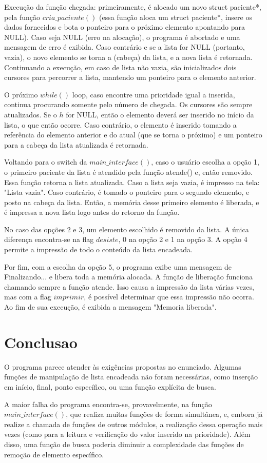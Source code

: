 \documentclass{article}
\begin{document}
Execução da função chegada: primeiramente, é alocado um novo struct paciente*, pela função $cria\_paciente()$ (essa função aloca um struct paciente*, insere os dados fornecidos e bota o ponteiro para o próximo elemento apontando para NULL). Caso seja NULL (erro na alocação), o programa é abortado e uma mensagem de erro é exibida. Caso contrário e se a lista for NULL (portanto, vazia), o novo elemento se torna a (cabeça) da lista, e a nova lista é retornada. Continuando a execução, em caso de lista não vazia, são inicializados dois cursores para percorrer a lista, mantendo um ponteiro para o elemento anterior.

O próximo $while()$ loop, caso encontre uma prioridade igual a inserida, continua procurando somente pelo número de chegada. Os cursores são sempre atualizados. Se o $h$ for NULL, então o elemento deverá ser inserido no início da lista, o que então ocorre. Caso contrário, o elemento é inserido tomando a referência do elemento anterior e do atual (que se torna o próximo) e um ponteiro para a cabeça da lista atualizada é retornada.

Voltando para o switch da $main\_interface()$, caso o usuário escolha a opção 1, o primeiro paciente da lista é atendido pela função atende() e, então removido. Essa função retorna a lista atualizada. Caso a lista seja vazia, é impresso na tela: "Lista vazia". Caso contrário, é tomado o ponteiro para o segundo elemento, e posto na cabeça da lista. Então, a memória desse primeiro elemento é liberada, e é impressa a nova lista logo antes do retorno da função.

No caso das opções 2 e 3, um elemento escolhido é removido da lista. A única diferença encontra-se na flag $desiste$, 0 na opção 2 e 1 na opção 3. A opção 4 permite a impressão de todo o conteúdo da lista encadeada.

Por fim, com a escolha da opção 5, o programa exibe uma mensagem de Finalizando... e libera toda a memória alocada. A função de liberação funciona chamando sempre a função atende. Isso causa a impressão da lista várias vezes, mas com a flag $imprimir$, é possível determinar que essa impressão não ocorra. Ao fim de sua execução, é exibida a mensagem "Memoria liberada".

\section{Conclusao}
O programa parece atender às exigências propostas no enunciado. Algumas funções de manipulação de lista encadeada não foram necessárias, como inserção em início, final, ponto específico, ou uma função explícita de busca.

A maior falha do programa encontra-se, provavelmente, na função $main\_interface()$, que realiza muitas funções de forma simultânea, e, embora já realize a chamada de funções de outros módulos, a realização dessa operação mais vezes (como para a leitura e verificação do valor inserido na prioridade). Além disso, uma função de busca poderia diminuir a complexidade das funções de remoção de elemento específico.
\end{document}
